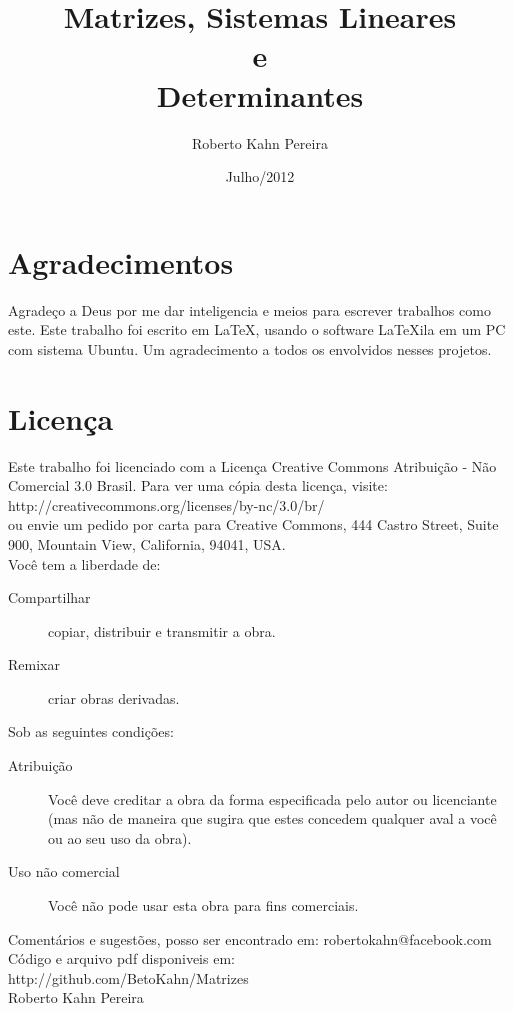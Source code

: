 \documentclass[10pt, a4paper, onecolumn, final]{article}
\title{Matrizes, Sistemas Lineares\\ e \\Determinantes}
\author{Roberto Kahn Pereira}
\date{Julho/2012}
\begin{document}
\maketitle
\newpage
\tableofcontents
\newpage
\section*{Agradecimentos}
Agradeço a Deus por me dar inteligencia e meios para escrever trabalhos como este. Este trabalho foi escrito em \LaTeX, usando o software LaTeXila em um PC com sistema Ubuntu. Um agradecimento a todos os envolvidos nesses projetos.
\section*{Licença}
Este trabalho foi licenciado com a Licença Creative Commons Atribuição - Não Comercial 3.0 Brasil. Para ver uma cópia desta licença, visite:\\http://creativecommons.org/licenses/by-nc/3.0/br/\\ ou envie um pedido por carta para Creative Commons, 444 Castro Street, Suite 900, Mountain View, California, 94041, USA.\\
Você tem a liberdade de:
\begin{description}
    \item[Compartilhar] copiar, distribuir e transmitir a obra.
    \item [Remixar] criar obras derivadas.
\end{description}
Sob as seguintes condições:
\begin{description}
    \item[Atribuição] Você deve creditar a obra da forma especificada pelo autor ou licenciante (mas não de maneira que sugira que estes concedem qualquer aval a você ou ao seu uso da obra).
    \item[Uso não comercial] Você não pode usar esta obra para fins comerciais.
\end{description}
Comentários e sugestões, posso ser encontrado em: robertokahn@facebook.com\\
Código e arquivo pdf disponiveis em:\\http://github.com/BetoKahn/Matrizes\\[0.5cm]
     Roberto Kahn Pereira
\end{document}
